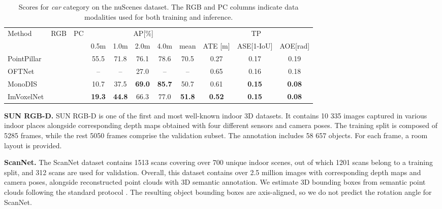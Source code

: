 \documentclass[10pt,twocolumn,letterpaper]{article}
\newcommand{\cmark}{\ding{51}}
\newcommand{\xmark}{\ding{55}}
\begin{document}
\begin{table*}[ht!]
    \centering \small
    \begingroup \setlength{\tabcolsep}{2pt}
    \begin{tabular}{l|cc|ccccc|ccc}
        \hline
        \multirow[c]{2}{*}{Method} & \multirow[c]{2}{*}{RGB}  & \multirow[c]{2}{*}{PC} & \multicolumn{5}{c|}{AP[\%]} & \multicolumn{3}{c}{TP} \\
        & & & 0.5m & 1.0m & 2.0m & 4.0m & mean & ATE [m] & ASE[1-IoU] & AOE[rad] \\ \hline
        PointPillar\cite{lang2019pointpillars} & \xmark & \cmark & 55.5 & 71.8 & 76.1 & 78.6 & 70.5 & 0.27 & 0.17 & 0.19 \\ \hline
        OFTNet \cite{roddick2018orthographic, simonelli2020disentangling} & \cmark & \xmark & -- & -- & 27.0 & -- & -- & 0.65 & 0.16 & 0.18 \\
        MonoDIS \cite{simonelli2020disentangling} & \cmark & \xmark & 10.7 & 37.5 & \textbf{69.0} & \textbf{85.7} & 50.7 & 0.61 & \textbf{0.15} & \textbf{0.08} \\
        ImVoxelNet & \cmark & \xmark & \textbf{19.3} & \textbf{44.8} & 66.3 & 77.0 & \textbf{51.8} & \textbf{0.52} & \textbf{0.15} & \textbf{0.08} \\ \hline
    \end{tabular} \endgroup
    \caption{Scores for \textit{car} category on the nuScenes dataset. The RGB and PC columns indicate data modalities used for both training and inference.}
    \label{tab:nuscenes}
\end{table*}

\textbf{SUN RGB-D.} SUN RGB-D \cite{song2015sunrgbd} is one of the first and most well-known indoor 3D datasets. It contains 10 335 images captured in various indoor places alongside corresponding depth maps obtained with four different sensors and camera poses. The training split is composed of 5285 frames, while the rest 5050 frames comprise the validation subset. The annotation includes 58 657 objects. For each frame, a room layout is provided.

\textbf{ScanNet.} The ScanNet dataset \cite{dai2017scannet} contains 1513 scans covering over 700 unique indoor scenes, out of which 1201 scans belong to a training split, and 312 scans are used for validation. Overall, this dataset contains over 2.5 million images with corresponding depth maps and camera poses, alongside reconstructed point clouds with 3D semantic annotation. We estimate 3D bounding boxes from semantic point clouds following the standard protocol \cite{qi2019votenet}. The resulting object bounding boxes are axis-aligned, so we do not predict the rotation angle  for ScanNet.
\end{document}
